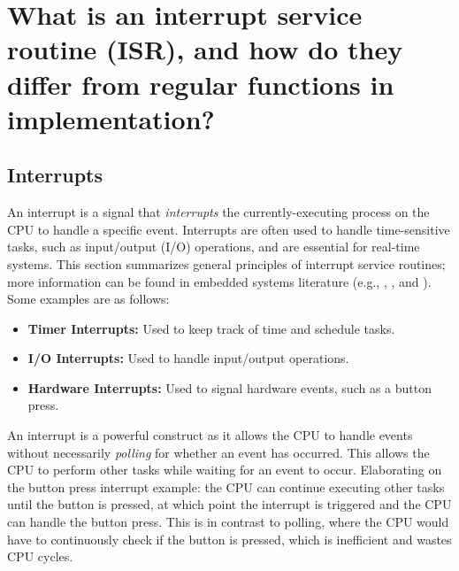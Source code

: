 \documentclass[main.tex]{subfiles}
\begin{document}
\section{What is an interrupt service routine (ISR), and how do they differ from regular functions in implementation?}

\spoilerline

\subsection{Interrupts}
An interrupt is a signal that \textit{interrupts} the currently-executing process on the CPU to handle a specific event. Interrupts are often used to handle time-sensitive tasks, such as input/output (I/O) operations, and are essential for real-time systems. This section summarizes general principles of interrupt service routines; more information can be found in embedded systems literature (e.g., \cite{white2024}, \cite{myersInterrupts}, and \cite{BetterEmbeddedSystemSoftware}).
Some examples are as follows:
\begin{itemize}
    \item \textbf{Timer Interrupts:} Used to keep track of time and schedule tasks.
    \item \textbf{I/O Interrupts:} Used to handle input/output operations.
    \item \textbf{Hardware Interrupts:} Used to signal hardware events, such as a button press.
\end{itemize}
\noindent An interrupt is a powerful construct as it allows the CPU to handle events without necessarily \textit{polling} for whether an event has occurred. This allows the CPU to perform other tasks while waiting for an event to occur. \newline
\newline
\noindent Elaborating on the button press interrupt example: the CPU can continue executing other tasks until the button is pressed, at which point the interrupt is triggered and the CPU can handle the button press. This is in contrast to polling, where the CPU would have to continuously check if the button is pressed, which is inefficient and wastes CPU cycles.
\end{document}
